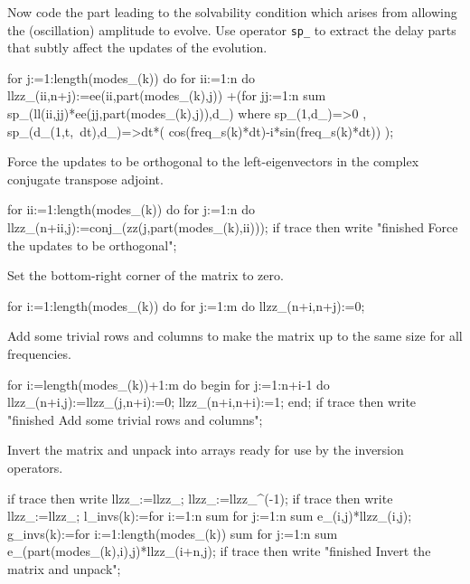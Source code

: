 \documentclass[11pt,a5paper]{article}
\begin{document}
Now code the part leading to the solvability condition which arises from allowing the (oscillation) amplitude to evolve.
Use operator \verb|sp_| to extract the delay parts that subtly affect the updates of the evolution.

\begin{reduce}
  for j:=1:length(modes_(k)) do 
    for ii:=1:n do llzz_(ii,n+j):=ee(ii,part(modes_(k),j))
     +(for jj:=1:n sum 
       sp_(ll(ii,jj)*ee(jj,part(modes_(k),j)),d_)
       where { sp_(1,d_)=>0
             , sp_(d_(1,t,~dt),d_)=>dt*(
               cos(freq_s(k)*dt)-i*sin(freq_s(k)*dt))
             });
\end{reduce}

Force the updates to be orthogonal to the left-eigenvectors in the complex conjugate transpose adjoint.
\begin{reduce}
  for ii:=1:length(modes_(k)) do 
    for j:=1:n do llzz_(n+ii,j):=conj_(zz(j,part(modes_(k),ii)));
  if trace then write "finished Force the updates to be orthogonal";
\end{reduce}

Set the bottom-right corner of the matrix to zero.
\begin{reduce}
  for i:=1:length(modes_(k)) do 
    for j:=1:m do llzz_(n+i,n+j):=0;
\end{reduce}

Add some trivial rows and columns to make the matrix up to the same size for all frequencies.
\begin{reduce}
  for i:=length(modes_(k))+1:m do begin 
    for j:=1:n+i-1 do llzz_(n+i,j):=llzz_(j,n+i):=0;
    llzz_(n+i,n+i):=1;
  end;
  if trace then write "finished Add some trivial rows and columns";
\end{reduce}

Invert the matrix and unpack into arrays ready for use by the inversion operators.
\begin{reduce}
  if trace then write llzz_:=llzz_; 
  llzz_:=llzz_^(-1);
  if trace then write llzz_:=llzz_;
  l_invs(k):=for i:=1:n sum for j:=1:n sum e_(i,j)*llzz_(i,j);
  g_invs(k):=for i:=1:length(modes_(k)) sum 
    for j:=1:n sum e_(part(modes_(k),i),j)*llzz_(i+n,j);
if trace then write "finished Invert the matrix and unpack";
\end{reduce}
\end{document}
